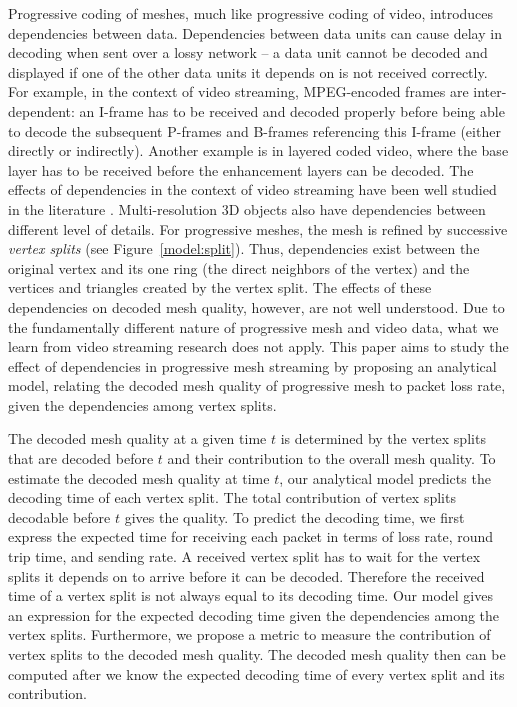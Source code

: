     Progressive coding of meshes, much like progressive coding of
    video, introduces dependencies between data.
    Dependencies between data units can cause delay in decoding
    when sent over a lossy network -- a data unit
    cannot be decoded and displayed if one of the other data units
    it depends on is not received correctly. For example, in the
    context of video streaming, MPEG-encoded frames are inter-dependent:
        an I-frame has to be received and decoded properly
    before being able to decode the subsequent P-frames and B-frames
        referencing this I-frame (either directly or indirectly).  Another
    example is in layered coded video, where the base layer has
    to be received before the enhancement layers can be decoded.
    The effects of dependencies in the context of video streaming
    have been well studied in the literature \cite{boyce98}.   Multi-resolution 3D
    objects also have dependencies between different level of details.
        For progressive meshes, the mesh is refined by successive
    \textit{vertex splits} (see Figure~\ref{model:split}).  Thus,
    dependencies exist between the original vertex and its one
    ring (the direct neighbors of the vertex)
    and the vertices and triangles created by the vertex split.
    The effects of these dependencies on decoded mesh quality, however,
    are not well understood.  Due to the fundamentally different
    nature of progressive mesh and video data, what we learn from
    video streaming research does not apply.  This paper aims to study
    the effect of dependencies in progressive mesh streaming by
    proposing an analytical model, relating the decoded mesh quality
    of progressive mesh to packet loss rate, given the dependencies
    among vertex splits.

    The decoded mesh quality at a given time $t$ is determined by 
    the vertex splits that are decoded before $t$ and their contribution to the overall mesh quality.
    To estimate the decoded mesh quality at time $t$, our analytical model
    predicts the decoding time of each vertex split.  The total contribution of vertex
    splits decodable before $t$ gives the quality.  To predict the decoding time, we first
    express the expected time for receiving each packet
        in terms of loss rate, round trip time, and sending rate.
    A received vertex split has to wait for the vertex splits
    it depends on to arrive before it can be decoded.
    Therefore the received time of a vertex split is not always equal to its decoding
    time.  Our model gives an expression for the expected
    decoding time given the dependencies among the vertex splits.
    Furthermore, we propose
    a metric to measure the contribution of 
    vertex splits to the
    decoded mesh quality. The decoded mesh quality then can be computed 
    after we know the expected decoding time of every vertex split
    and its contribution.

